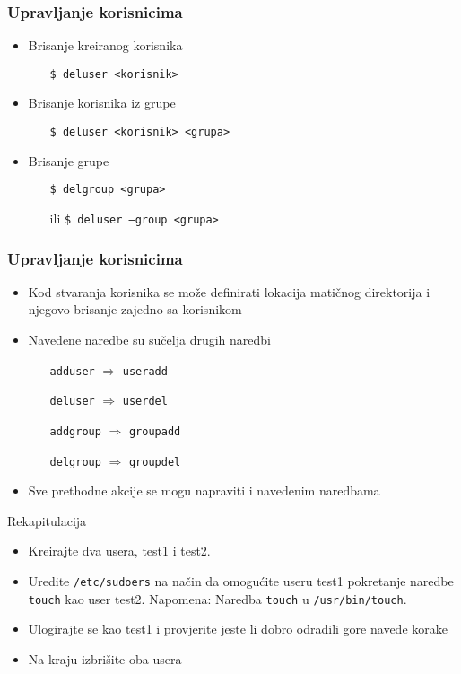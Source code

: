 \documentclass[table,usenames,dvipsnames] {beamer}
\newcommand{\shell}[1]{\texttt{#1}}
\begin{document}
\begin{frame}[t]
\frametitle{Upravljanje korisnicima}
\begin{itemize}
  \item Brisanje kreiranog korisnika
  \begin{itemize}
    \item[] \shell{\$ deluser <korisnik>}
  \end{itemize}
  \item Brisanje korisnika iz grupe
  \begin{itemize}
    \item[] \shell{\$ deluser <korisnik> <grupa>}
  \end{itemize}
  \item Brisanje grupe
  \begin{itemize}
  	\item[] \shell{\$ delgroup <grupa>}
    \item[ili] \shell{\$ deluser --group <grupa>}
  \end{itemize}
\end{itemize}
\end{frame}

\begin{frame}[t]
\frametitle{Upravljanje korisnicima}
\begin{itemize}
  \item Kod stvaranja korisnika se može definirati lokacija matičnog 
        direktorija i njegovo brisanje zajedno sa korisnikom
  \item Navedene naredbe su sučelja drugih naredbi
  \begin{itemize}
    \item[] \shell{adduser} $\Rightarrow$ \shell{useradd}
    \item[] \shell{deluser} $\Rightarrow$ \shell{userdel}
    \item[] \shell{addgroup} $\Rightarrow$ \shell{groupadd}
    \item[] \shell{delgroup} $\Rightarrow$ \shell{groupdel}
  \end{itemize}
  \item Sve prethodne akcije se mogu napraviti i navedenim naredbama
\end{itemize}
\end{frame}

\begin{frame}{Rekapitulacija}
\begin{itemize}
\item Kreirajte dva usera, test1 i test2.
\item Uredite \shell{/etc/sudoers} na način da omogućite useru test1 pokretanje naredbe \shell{touch} kao user test2. Napomena: Naredba \shell{touch} u \shell{/usr/bin/touch}.
\item Ulogirajte se kao test1 i provjerite jeste li dobro odradili gore navede korake
\item Na kraju izbrišite oba usera 
\end{itemize}
\end{frame}
\end{document}
